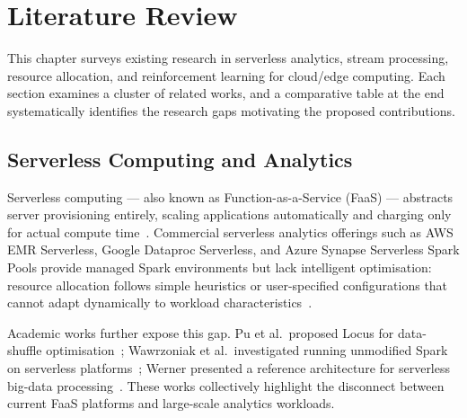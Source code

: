 \chapter{Literature Review}
\label{chap:related_work}

This chapter surveys existing research in serverless analytics, stream processing,
resource allocation, and reinforcement learning for cloud/edge computing. Each section
examines a cluster of related works, and a comparative table at the end systematically
identifies the research gaps motivating the proposed contributions.

\section{Serverless Computing and Analytics}
Serverless computing — also known as Function-as-a-Service (FaaS) — abstracts server
provisioning entirely, scaling applications automatically and charging only for actual
compute time~\cite{hendrickson2020serverless}. Commercial serverless analytics offerings
such as AWS EMR Serverless, Google Dataproc Serverless, and Azure Synapse Serverless
Spark Pools provide managed Spark environments but lack intelligent optimisation:
resource allocation follows simple heuristics or user-specified configurations that
cannot adapt dynamically to workload
characteristics~\cite{aws_emr_serverless_docs,dataproc_serverless_docs,azure_synapse_docs}.

Academic works further expose this gap. Pu et al.\ proposed Locus for data-shuffle
optimisation~\cite{pu2019shuffling}; Wawrzoniak et al.\ investigated running
unmodified Spark on serverless platforms~\cite{wawrzoniak2024off}; Werner presented a
reference architecture for serverless big-data processing~\cite{werner2024reference}.
These works collectively highlight the disconnect between current FaaS platforms and
large-scale analytics workloads.

